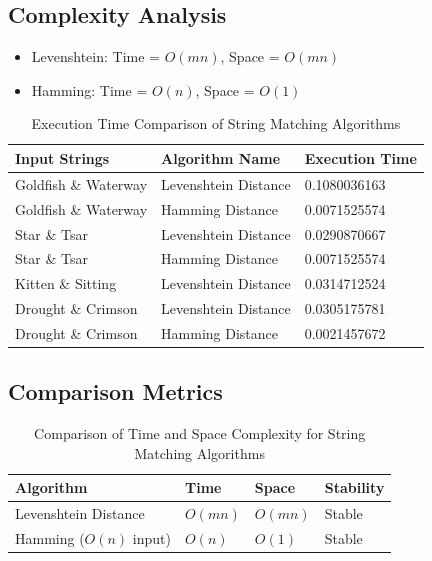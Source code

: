 \documentclass[conference]{IEEEtran}
\begin{document}
\subsection{Complexity Analysis}
\begin{itemize}
\item Levenshtein: Time = $O(mn)$, Space = $O(mn)$
\item Hamming: Time = $O(n)$, Space = $O(1)$
\end{itemize}

\begin{table}[htbp]
\caption{Execution Time Comparison of String Matching Algorithms}
\centering
\renewcommand{\arraystretch}{1.2} %
\begin{tabular}{|p{2.5cm}|p{2.6cm}|p{2.6cm}|}
\hline
\textbf{Input Strings} & \textbf{Algorithm Name} & \textbf{Execution Time} \\
\hline
Goldfish \& Waterway & Levenshtein Distance & 0.1080036163 \\
\hline
Goldfish \& Waterway & Hamming Distance & 0.0071525574 \\
\hline
Star \& Tsar & Levenshtein Distance & 0.0290870667 \\
\hline
Star \& Tsar & Hamming Distance & 0.0071525574 \\
\hline
Kitten \& Sitting & Levenshtein Distance & 0.0314712524 \\
\hline
Drought \& Crimson & Levenshtein Distance & 0.0305175781 \\
\hline
Drought \& Crimson & Hamming Distance & 0.0021457672 \\
\hline
\end{tabular}
\label{tab:execution_times}
\end{table}

\subsection{Comparison Metrics}
\begin{table}[htbp]
\caption{Comparison of Time and Space Complexity for String Matching Algorithms}
\centering
\scriptsize
\renewcommand{\arraystretch}{1.15}
\begin{tabular}{|p{2.2cm}|p{1.2cm}|p{1.5cm}|p{0.9cm}|}
\hline
\textbf{Algorithm} & \textbf{Time} & \textbf{Space} & \textbf{Stability} \\
\hline
Levenshtein Distance & $O(mn)$ & $O(mn)$ & Stable \\
\hline
\makecell[l]{Hamming \\ ($O(n)$ input)} & $O(n)$ & $O(1)$ & Stable \\
\hline
\end{tabular}
\label{tab:complexity}
\end{table}
\end{document}
